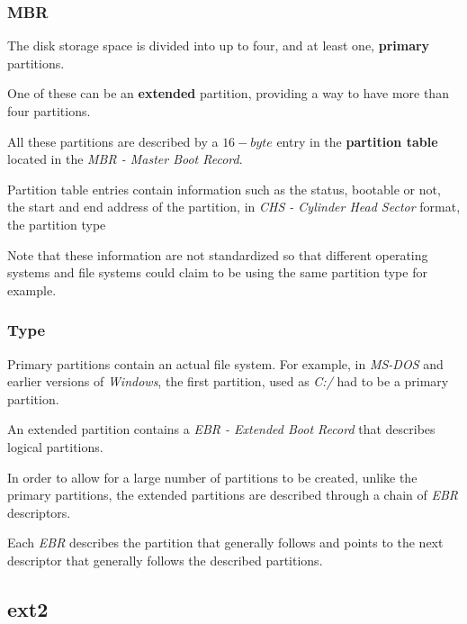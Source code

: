 \begin{frame}
  \frametitle{MBR}

  The disk storage space is divided into up to four, and at least one,
  \textbf{primary} partitions.

  \-

  One of these can be an \textbf{extended} partition, providing a way to
  have more than four partitions.

  \-

  All these partitions are described by a $16-byte$ entry in the
  \textbf{partition table} located in the \textit{MBR - Master Boot Record}.

  \-

  Partition table entries contain information such as the status, bootable or
  not, the start and end address of the partition, in \textit{CHS - Cylinder
  Head Sector} format, the partition type \etc{}

  \-

  Note that these information are not standardized so that different operating
  systems and file systems could claim to be using the same partition type
  for example.
\end{frame}


\begin{frame}
  \frametitle{Type}

  Primary partitions contain an actual file system. For example, in
  \textit{MS-DOS} and earlier versions of \textit{Windows}, the first
  partition, used as \textit{C:/} had to be a primary partition.

  \-

  An extended partition contains a \textit{EBR - Extended Boot Record} that
  describes logical partitions.

  \-

  In order to allow for a large number of partitions to be created, unlike
  the primary partitions, the extended partitions are described through
  a chain of \textit{EBR} descriptors.

  \-

  Each \textit{EBR} describes the partition that generally follows and points
  to the next descriptor that generally follows the described partitions.
\end{frame}


\subsection{ext2}

